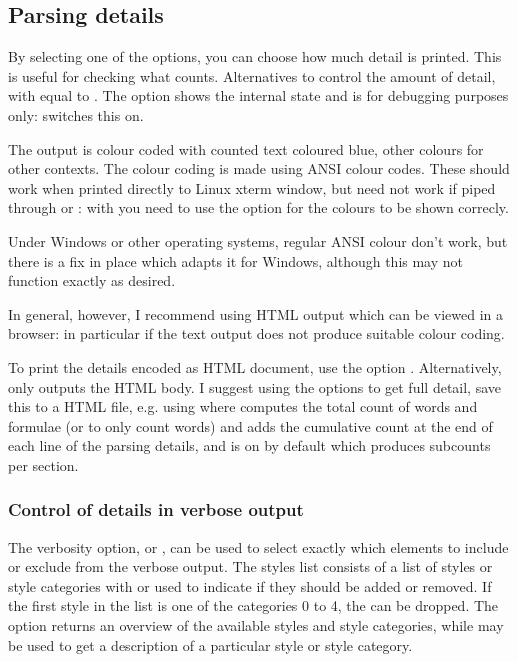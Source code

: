 \documentclass{article}
\begin{document}
\subsection{Parsing details}

By selecting one of the  options, you can choose how much detail is printed. This is useful for checking what \TeXcount{} counts. Alternatives  to  control the amount of detail, with  equal to . The option  shows the internal state and is for debugging purposes only:  switches this on.

The output is colour coded with counted text coloured blue, other colours for other contexts. The colour coding is made using ANSI colour codes. These should work when printed directly to Linux xterm window, but need not work if piped through  or : with  you need to use the option  for the colours to be shown correcly.

Under Windows or other operating systems, regular ANSI colour don't work, but there is a fix in place which adapts it for Windows, although this may not function exactly as desired.

In general, however, I recommend using HTML output which can be viewed in a browser: in particular if the text output does not produce suitable colour coding.

To print the details encoded as HTML document, use the option . Alternatively,  only outputs the HTML body. I suggest using the options  to get full detail, save this to a HTML file, e.g. using
where  computes the total count of words and formulae (or  to only count words) and adds the cumulative count at the end of each line of the parsing details, and  is on by default which produces subcounts per section.

\subsubsection{Control of details in verbose output}

The verbosity option,  or , can be used to select exactly which elements to include or exclude from the verbose output. The styles list consists of a list of styles or style categories with  or  used to indicate if they should be added or removed. If the first style in the list is one of the categories 0 to 4, the \code{=} can be dropped. The option  returns an overview of the available styles and style categories, while  may be used to get a description of a particular style or style category.
\end{document}
